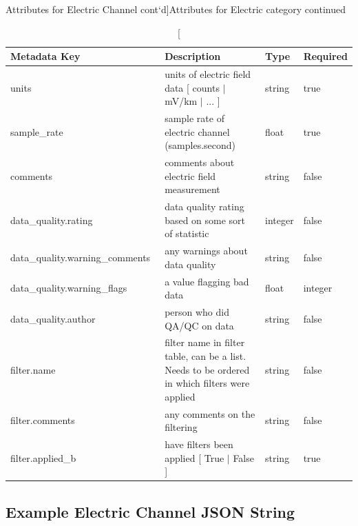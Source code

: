 \documentclass{article}
\begin{document}
\newpage
\begin{table}[htb!]
    \caption[Attributes for Electric Channel cont`d]{Attributes for Electric category continued}
    \begin{tabular}{|l|p{3in}|l|l|}
        \hline
        \textbf{Metadata Key} & \textbf{Description} & \textbf{Type} & \textbf{Required} \\ \hline
        units\ & units of electric field data [ counts $|$ mV/km $|$ ... ] & string & true \\ \hline
        sample\_rate\ & sample rate of electric channel (samples.second) & float & true \\ \hline
        comments\ & comments about electric field measurement & string &  false \\ \hline
        data\_quality.rating\ & data quality rating based on some sort of statistic & integer & false \\ \hline
        data\_quality.warning\_comments\ & any warnings about data quality & string & false \\ \hline
        data\_quality.warning\_flags\ & a value flagging bad data  & float &  integer \\ \hline
        data\_quality.author\ & person who did QA/QC on data & string &  false \\ \hline
        filter.name\ & filter name in filter table, can be a list. Needs to be ordered in which filters were applied & string &  false \\ \hline
        filter.comments\ & any comments on the filtering & string &  false \\ \hline
        filter.applied\_b & have filters been applied [ True $|$ False ] & string & true \\ \hline
        \end{tabular}
        \label{tab:electric02}
\end{table}    

\newpage
\subsection{Example Electric Channel JSON String}
\end{document}
